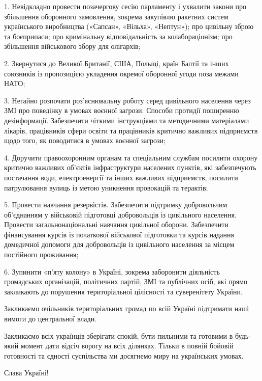 1. Невідкладно провести позачергову сесію парламенту і ухвалити закони про
збільшення оборонного замовлення, зокрема закупівлю ракетних систем
українського виробництва («Сапсан», «Вільха», «Нептун»); про цивільну зброю та
боєприпаси; про кримінальну відповідальність за колабораціонізм; про збільшення
військового збору для олігархів;

2. Звернутися до Великої Британії, США, Польщі, країн Балтії та інших союзників
із пропозицією укладення окремої оборонної угоди поза межами НАТО;

3. Негайно розпочати роз’яснювальну роботу серед цивільного населення через ЗМІ
про поведінку в умовах воєнної загрози. Способи протидії поширенню
дезінформації. Забезпечити чіткими інструкціями та методичними матеріалами
лікарів, працівників сфери освіти та працівників критично важливих підприємств
щодо того, як поводитися в умовах воєнної загрози;

4. Доручити правоохоронним органам та спеціальним службам посилити охорону
критично важливих об’єктів інфраструктури населених пунктів, які забезпечують
постачання води, електроенергії та інших важливих підприємств, посилити
патрулювання вулиць із метою уникнення провокацій та терактів;

5. Провести навчання резервістів. Забезпечити підтримку добровольчим
об’єднанням у військовій підготовці добровольців із цивільного населення.
Провести загальнонаціональні навчання цивільної оборони. Забезпечити
фінансування курсів із початкової військової підготовки та курсів надання
домедичної допомоги для добровольців із цивільного населення за місцем
постійного проживання;

6. Зупинити «п’яту колону» в Україні, зокрема заборонити діяльність громадських
організацій, політичних партій, ЗМІ та публічних осіб, які прямо закликають до
порушення територіальної цілісності та суверенітету України.

Закликаємо очільників територіальних громад по всій Україні підтримати наші
вимоги до центральної влади.

Закликаємо всіх українців зберігати спокій, бути пильними та готовими в
будь-який момент дати відсіч ворогу на всіх ділянках. Тільки в повній бойовій
готовності та єдності суспільства ми досягнемо миру на українських умовах.

Слава Україні!

